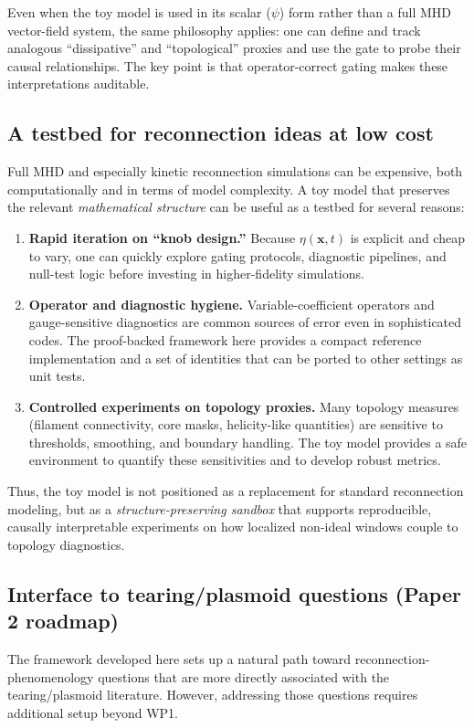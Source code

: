 \documentclass[11pt]{article}
\theoremstyle{plain}
\theoremstyle{definition}
\theoremstyle{remark}
\begin{document}
Even when the toy model is used in its scalar ($\psi$) form rather than a full MHD vector-field system,
the same philosophy applies: one can define and track analogous ``dissipative'' and ``topological''
proxies and use the gate to probe their causal relationships. The key point is that operator-correct
gating makes these interpretations auditable.

\subsection{A testbed for reconnection ideas at low cost}\label{sec:discussion_testbed}
Full MHD and especially kinetic reconnection simulations can be expensive, both computationally and in
terms of model complexity. A toy model that preserves the relevant \emph{mathematical structure} can be
useful as a testbed for several reasons:

\begin{enumerate}[leftmargin=*]
  \item \textbf{Rapid iteration on ``knob design.''}
  Because $\eta(\mathbf{x},t)$ is explicit and cheap to vary, one can quickly explore gating protocols,
  diagnostic pipelines, and null-test logic before investing in higher-fidelity simulations.

  \item \textbf{Operator and diagnostic hygiene.}
  Variable-coefficient operators and gauge-sensitive diagnostics are common sources of error even in
  sophisticated codes. The proof-backed framework here provides a compact reference implementation and
  a set of identities that can be ported to other settings as unit tests.

  \item \textbf{Controlled experiments on topology proxies.}
  Many topology measures (filament connectivity, core masks, helicity-like quantities) are sensitive to
  thresholds, smoothing, and boundary handling. The toy model provides a safe environment to quantify
  these sensitivities and to develop robust metrics.
\end{enumerate}

Thus, the toy model is not positioned as a replacement for standard reconnection modeling, but as a
\emph{structure-preserving sandbox} that supports reproducible, causally interpretable experiments on
how localized non-ideal windows couple to topology diagnostics.

\subsection{Interface to tearing/plasmoid questions (Paper 2 roadmap)}\label{sec:discussion_roadmap}
The framework developed here sets up a natural path toward reconnection-phenomenology questions that
are more directly associated with the tearing/plasmoid literature. However, addressing those questions
requires additional setup beyond WP1.
\end{document}

